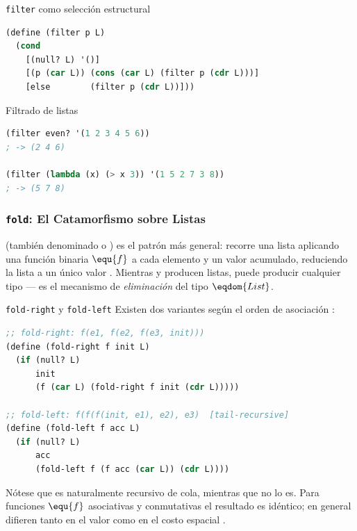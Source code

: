 \begin{definicion}{\texttt{filter} como selección estructural}
\begin{lstlisting}[language=Lisp, caption={Definición recursiva de filter}]
(define (filter p L)
  (cond
    [(null? L) '()]
    [(p (car L)) (cons (car L) (filter p (cdr L)))]
    [else        (filter p (cdr L))]))
\end{lstlisting}
\end{definicion}

\begin{ejemplo}{Filtrado de listas}
\begin{lstlisting}[language=Lisp, caption={Uso de filter para selección predicativa}]
(filter even? '(1 2 3 4 5 6))
; -> (2 4 6)

(filter (lambda (x) (> x 3)) '(1 5 2 7 3 8))
; -> (5 7 8)
\end{lstlisting}
\end{ejemplo}

\subsubsection*{\texttt{fold}: El Catamorfismo sobre Listas}

 (también denominado  o ) es el patrón más general: recorre una lista aplicando una función binaria $\equ{f}$ a cada elemento y un valor acumulado, reduciendo la lista a un único valor \cite{SICP, HtDP}. Mientras  y  producen listas,  puede producir cualquier tipo — es el mecanismo de \textit{eliminación} del tipo $\eqdom{List}$.

\begin{definicion}{\texttt{fold-right} y \texttt{fold-left}}
Existen dos variantes según el orden de asociación \cite{SICP}:
\begin{lstlisting}[language=Lisp, caption={Definición de fold-right y fold-left}]
;; fold-right: f(e1, f(e2, f(e3, init)))
(define (fold-right f init L)
  (if (null? L)
      init
      (f (car L) (fold-right f init (cdr L)))))

;; fold-left: f(f(f(init, e1), e2), e3)  [tail-recursive]
(define (fold-left f acc L)
  (if (null? L)
      acc
      (fold-left f (f acc (car L)) (cdr L))))
\end{lstlisting}
Nótese que  es naturalmente recursivo de cola, mientras que  no lo es. Para funciones $\equ{f}$ asociativas y conmutativas el resultado es idéntico; en general difieren tanto en el valor como en el costo espacial \cite{SICP}.
\end{definicion}

